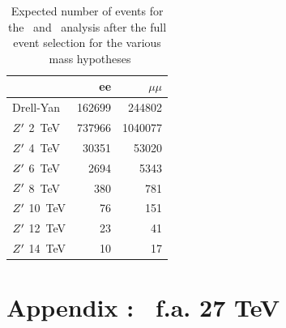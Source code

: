 \begin{table}[!htb]
   \centering
\begin{tabular}{|l|r|r|}
  \hline
  \hline
 & ee & $\mu\mu$  \\
  \hline
  Drell-Yan    & 162699 &  244802 \\
  \hline
  $Z^{\prime}$ 2~TeV  & 737966 & 1040077 \\
  $Z^{\prime}$ 4~TeV  &  30351 &   53020 \\
  $Z^{\prime}$ 6~TeV  &   2694 &    5343 \\
  $Z^{\prime}$ 8~TeV  &    380 &     781 \\
  $Z^{\prime}$ 10~TeV &     76 &     151 \\
  $Z^{\prime}$ 12~TeV &     23 &      41 \\
  $Z^{\prime}$ 14~TeV &     10 &      17 \\
  \hline
  \hline
\end{tabular}
  \caption{Expected number of events for the \Zpee\ and \Zpmumu\ analysis after the full event selection for the various \Zp\ mass hypotheses}
  \label{tab:leptonicresonances27:yieldsll}
\end{table}

\clearpage
\newpage

\section{Appendix : \Zpmumu\ f.a. 27 TeV}
\label{appendix:zpmumufalvano27}

